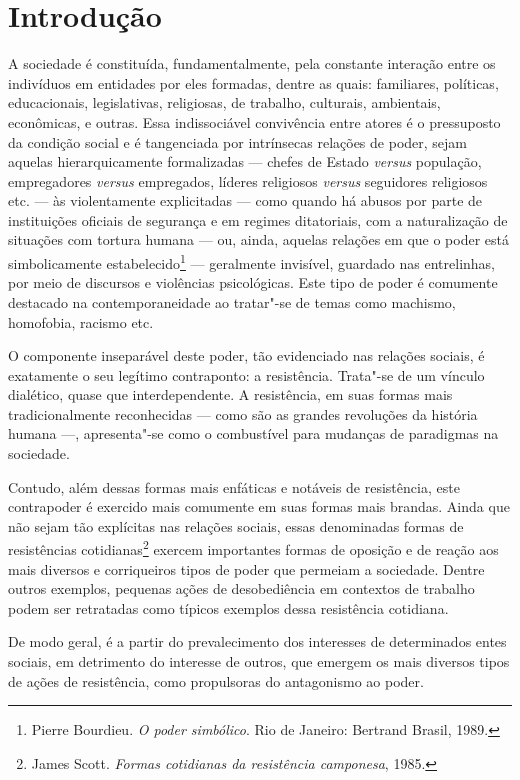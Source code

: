  \section{Introdução}

\noindent{}A sociedade é constituída, fundamentalmente, pela constante interação
entre os indivíduos em entidades por eles formadas, dentre as quais:
familiares, políticas, educacionais, legislativas, religiosas, de
trabalho, culturais, ambientais, econômicas, e outras. Essa
indissociável convivência entre atores é o pressuposto da condição
social e é tangenciada por intrínsecas relações de poder, sejam aquelas
hierarquicamente formalizadas --- chefes de Estado \textit{versus}
população, empregadores \textit{versus} empregados, líderes religiosos
\textit{versus} seguidores religiosos etc. --- às violentamente
explicitadas --- como quando há abusos por parte de instituições oficiais
de segurança e em regimes ditatoriais, com a naturalização de situações
com tortura humana --- ou, ainda, aquelas relações em que o poder está
simbolicamente estabelecido\footnote{Pierre Bourdieu. \textit{O poder simbólico}. Rio de Janeiro: Bertrand Brasil, 1989.} --- geralmente invisível,
guardado nas entrelinhas, por meio de discursos e violências
psicológicas. Este tipo de poder é comumente destacado na
contemporaneidade ao tratar"-se de temas como machismo, homofobia,
racismo etc.

O componente inseparável deste poder, tão evidenciado nas relações
sociais, é exatamente o seu legítimo contraponto: a resistência.
Trata"-se de um vínculo dialético, quase que interdependente. A
resistência, em suas formas mais tradicionalmente reconhecidas --- como
são as grandes revoluções da história humana ---, apresenta"-se como o
combustível para mudanças de paradigmas na sociedade.

Contudo, além dessas formas mais enfáticas e notáveis de resistência,
este contrapoder é exercido mais comumente em suas formas mais brandas.
Ainda que não sejam tão explícitas nas relações sociais, essas
denominadas formas de resistências cotidianas\footnote{James Scott. \textit{Formas cotidianas da resistência camponesa}, 1985.} exercem
importantes formas de oposição e de reação aos mais diversos e
corriqueiros tipos de poder que permeiam a sociedade. Dentre outros
exemplos, pequenas ações de desobediência em contextos de trabalho podem
ser retratadas como típicos exemplos dessa resistência cotidiana.

De modo geral, é a partir do prevalecimento dos interesses de
determinados entes sociais, em detrimento do interesse de outros, que
emergem os mais diversos tipos de ações de resistência, como propulsoras
do antagonismo ao poder.

